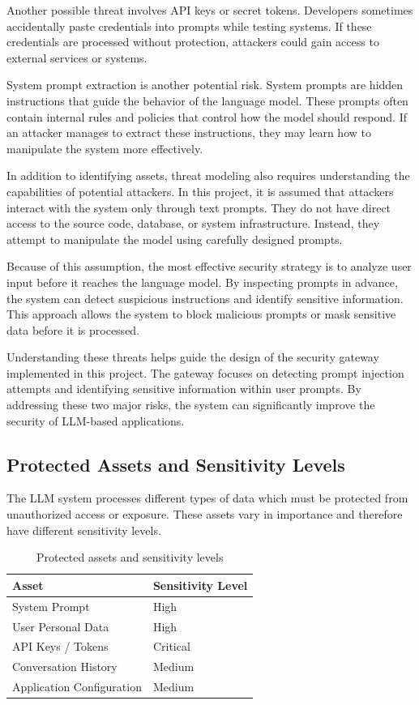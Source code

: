 \documentclass[conference]{IEEEtran}
\begin{document}
Another possible threat involves API keys or secret tokens. Developers sometimes accidentally paste credentials into prompts while testing systems. If these credentials are processed without protection, attackers could gain access to external services or systems.

System prompt extraction is another potential risk. System prompts are hidden instructions that guide the behavior of the language model. These prompts often contain internal rules and policies that control how the model should respond. If an attacker manages to extract these instructions, they may learn how to manipulate the system more effectively.



In addition to identifying assets, threat modeling also requires understanding the capabilities of potential attackers. In this project, it is assumed that attackers interact with the system only through text prompts. They do not have direct access to the source code, database, or system infrastructure. Instead, they attempt to manipulate the model using carefully designed prompts.

Because of this assumption, the most effective security strategy is to analyze user input before it reaches the language model. By inspecting prompts in advance, the system can detect suspicious instructions and identify sensitive information. This approach allows the system to block malicious prompts or mask sensitive data before it is processed.

Understanding these threats helps guide the design of the security gateway implemented in this project. The gateway focuses on detecting prompt injection attempts and identifying sensitive information within user prompts. By addressing these two major risks, the system can significantly improve the security of LLM-based applications.

\subsection{Protected Assets and Sensitivity Levels}

The LLM system processes different types of data which must be protected from unauthorized access or exposure. These assets vary in importance and therefore have different sensitivity levels.

\begin{table}[h]
\centering
\begin{tabular}{|l|l|}
\hline
Asset & Sensitivity Level \\
\hline
System Prompt & High \\
User Personal Data & High \\
API Keys / Tokens & Critical \\
Conversation History & Medium \\
Application Configuration & Medium \\
\hline
\end{tabular}
\caption{Protected assets and sensitivity levels}
\end{table}
\end{document}
